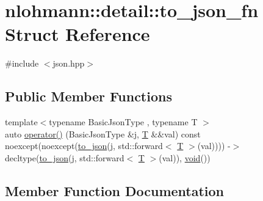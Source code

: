 \hypertarget{structnlohmann_1_1detail_1_1to__json__fn}{}\section{nlohmann\+::detail\+::to\+\_\+json\+\_\+fn Struct Reference}
\label{structnlohmann_1_1detail_1_1to__json__fn}


{\ttfamily \#include $<$json.\+hpp$>$}

\subsection*{Public Member Functions}
\begin{DoxyCompactItemize}
\item 
{\footnotesize template$<$typename Basic\+Json\+Type , typename T $>$ }\\auto \mbox{\hyperlink{structnlohmann_1_1detail_1_1to__json__fn_aecfb5114c8a737fc89d98589482795b8}{operator()}} (Basic\+Json\+Type \&j, \mbox{\hyperlink{_keyboard_event_8h_adf1f3edb9115acb0a1e04209b7a9937b}{T}} \&\&val) const noexcept(noexcept(\mbox{\hyperlink{namespacenlohmann_1_1detail_a1a804b98cbe89b7e44b698f2ca860490}{to\+\_\+json}}(j, std\+::forward$<$ \mbox{\hyperlink{_keyboard_event_8h_adf1f3edb9115acb0a1e04209b7a9937b}{T}} $>$(val)))) -\/$>$ decltype(\mbox{\hyperlink{namespacenlohmann_1_1detail_a1a804b98cbe89b7e44b698f2ca860490}{to\+\_\+json}}(j, std\+::forward$<$ \mbox{\hyperlink{_keyboard_event_8h_adf1f3edb9115acb0a1e04209b7a9937b}{T}} $>$(val)), \mbox{\hyperlink{namespacenlohmann_1_1detail_a59fca69799f6b9e366710cb9043aa77d}{void}}())
\end{DoxyCompactItemize}


\subsection{Member Function Documentation}
\mbox{\label{structnlohmann_1_1detail_1_1to__json__fn_aecfb5114c8a737fc89d98589482795b8}} 
